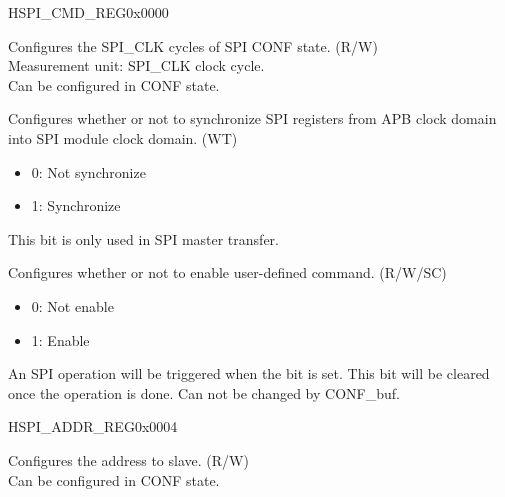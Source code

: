 \begin{register}{H}{SPI\_CMD\_REG}{0x0000}\label{regdesc:SPICMDREG}
%
%
%
%
%
\regnewline%
\begin{regdesc}\begin{reglist}
\label{fielddesc:SPICONFBITLEN}\item [SPI\_CONF\_BITLEN] Configures the SPI\_CLK cycles of SPI CONF state. (R/W)\\
Measurement unit: SPI\_CLK clock cycle.\\
Can be configured in CONF state. 
\label{fielddesc:SPIUPDATE}\item [SPI\_UPDATE] Configures whether or not to synchronize SPI registers from APB clock domain into SPI module clock domain. (WT)\\
\begin{itemize}
    \item 0: Not synchronize
    \item 1: Synchronize
\end{itemize}
This bit is only used in SPI master transfer. 
\label{fielddesc:SPIUSR}\item [SPI\_USR] Configures whether or not to enable user-defined command. (R/W/SC)\\
\begin{itemize}
    \item 0: Not enable
    \item 1: Enable
\end{itemize}
An SPI operation will be triggered when the bit is set. This bit will be cleared once the operation is done. Can not be changed by CONF\_buf.
\end{reglist}\end{regdesc}
\end{register}


\begin{register}{H}{SPI\_ADDR\_REG}{0x0004}\label{regdesc:SPIADDRREG}
%
\regnewline%
\begin{regdesc}\begin{reglist}
\label{fielddesc:SPIUSRADDRVALUE}\item [SPI\_USR\_ADDR\_VALUE] Configures the address to slave. (R/W)\\
Can be configured in CONF state. 
\end{reglist}\end{regdesc}
\end{register}



